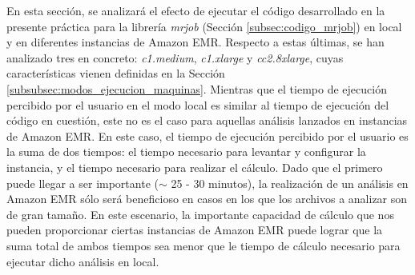 \documentclass[10pt, spanish]{article}
\begin{document}
En esta sección, se analizará el efecto de ejecutar el código desarrollado en la presente práctica para la librería \textit{mrjob} (Sección \ref{subsec:codigo_mrjob}) en local y en diferentes instancias de Amazon EMR. Respecto a estas últimas, se han analizado tres en concreto: \textit{c1.medium}, \textit{c1.xlarge} y \textit{cc2.8xlarge}, cuyas características vienen definidas en la Sección \ref{subsubsec:modos_ejecucion_maquinas}. Mientras que el tiempo de ejecución percibido por el usuario en el modo local es similar al tiempo de ejecución del código en cuestión, este no es el caso para aquellas análisis lanzados en instancias de Amazon EMR. En este caso, el tiempo de ejecución percibido por el usuario es la suma de dos tiempos: el tiempo necesario para levantar y configurar la instancia, y el tiempo necesario para realizar el cálculo. Dado que el primero puede llegar a ser importante ($\sim$ 25 - 30 minutos), la realización de un análisis en Amazon EMR sólo será beneficioso en casos en los que los archivos a analizar son de gran tamaño. En este escenario, la importante capacidad de cálculo que nos pueden proporcionar ciertas instancias de Amazon EMR puede lograr que la suma total de ambos tiempos sea menor que le tiempo de cálculo necesario para ejecutar dicho análisis en local.
\end{document}
